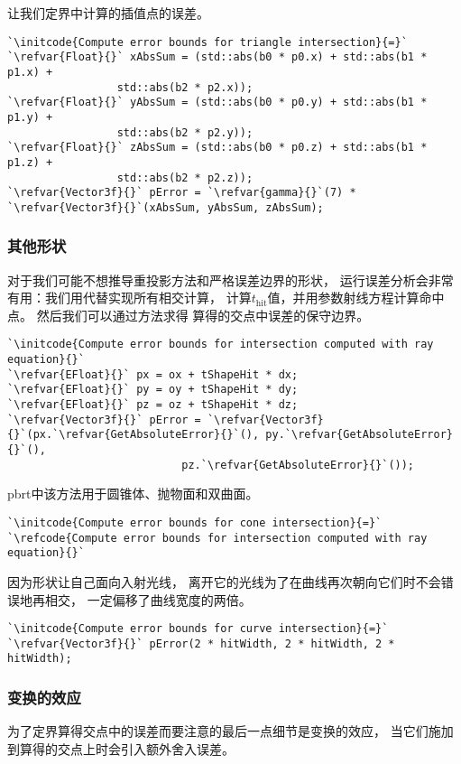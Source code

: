 让我们定界中计算的插值点的误差。
\begin{lstlisting}
`\initcode{Compute error bounds for triangle intersection}{=}`
`\refvar{Float}{}` xAbsSum = (std::abs(b0 * p0.x) + std::abs(b1 * p1.x) +
                 std::abs(b2 * p2.x));
`\refvar{Float}{}` yAbsSum = (std::abs(b0 * p0.y) + std::abs(b1 * p1.y) +
                 std::abs(b2 * p2.y));
`\refvar{Float}{}` zAbsSum = (std::abs(b0 * p0.z) + std::abs(b1 * p1.z) +
                 std::abs(b2 * p2.z));
`\refvar{Vector3f}{}` pError = `\refvar{gamma}{}`(7) * `\refvar{Vector3f}{}`(xAbsSum, yAbsSum, zAbsSum);
\end{lstlisting}

\subsubsection*{其他形状}
对于我们可能不想推导重投影方法和严格误差边界的形状，
运行误差分析会非常有用：我们用代替实现所有相交计算，
计算$t_{\text{hit}}$值，并用参数射线方程计算命中点。
然后我们可以通过方法求得
算得的交点中误差的保守边界。
\begin{lstlisting}
`\initcode{Compute error bounds for intersection computed with ray equation}{}`
`\refvar{EFloat}{}` px = ox + tShapeHit * dx;
`\refvar{EFloat}{}` py = oy + tShapeHit * dy;
`\refvar{EFloat}{}` pz = oz + tShapeHit * dz;
`\refvar{Vector3f}{}` pError = `\refvar{Vector3f}{}`(px.`\refvar{GetAbsoluteError}{}`(), py.`\refvar{GetAbsoluteError}{}`(),
                           pz.`\refvar{GetAbsoluteError}{}`());
\end{lstlisting}

pbrt中该方法用于圆锥体、抛物面和双曲面。
\begin{lstlisting}
`\initcode{Compute error bounds for cone intersection}{=}`
`\refcode{Compute error bounds for intersection computed with ray equation}{}`
\end{lstlisting}

因为形状让自己面向入射光线，
离开它的光线为了在曲线再次朝向它们时不会错误地再相交，
一定偏移了曲线宽度的两倍。
\begin{lstlisting}
`\initcode{Compute error bounds for curve intersection}{=}`
`\refvar{Vector3f}{}` pError(2 * hitWidth, 2 * hitWidth, 2 * hitWidth);
\end{lstlisting}

\subsubsection*{变换的效应}
为了定界算得交点中的误差而要注意的最后一点细节是变换的效应，
当它们施加到算得的交点上时会引入额外舍入误差。

